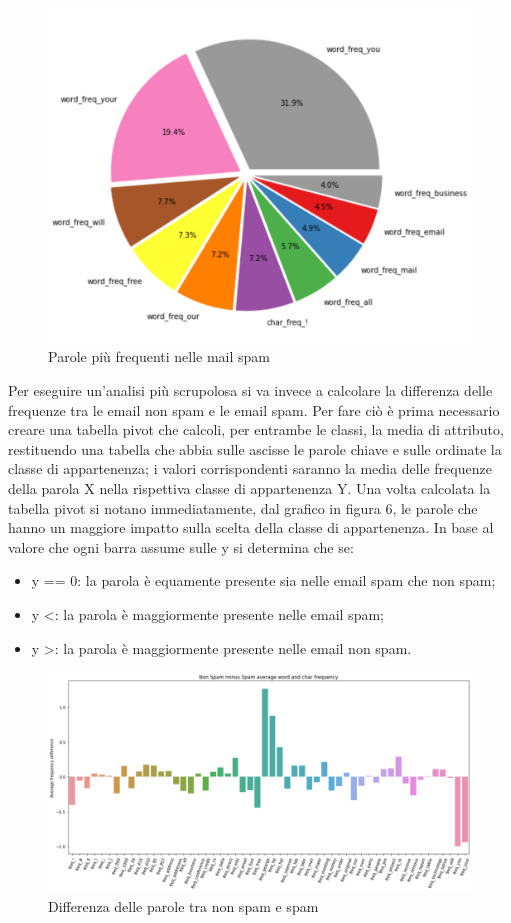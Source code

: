 \documentclass[12pt,a4paper]{article}
\begin{document}
\begin{figure}[H]
    \centering
    \includegraphics[width=.8\linewidth]{top_10_only_spam.png}
    \caption{Parole più frequenti nelle mail spam}
\end{figure}
Per eseguire un'analisi più scrupolosa si va invece a calcolare la differenza delle frequenze tra le email non spam e le email spam.
Per fare ciò è prima necessario creare una tabella pivot che calcoli, per entrambe le classi, la media di attributo, restituendo una tabella che abbia sulle ascisse le parole chiave e sulle ordinate la classe di appartenenza; i valori corrispondenti saranno la media delle frequenze della parola X nella rispettiva classe di appartenenza Y.
Una volta calcolata la tabella pivot si notano immediatamente, dal grafico in figura 6, le parole che hanno un maggiore impatto sulla scelta della classe di appartenenza. In base al valore che ogni barra assume sulle y si determina che se:
\begin{itemize}
    \item y == 0: la parola è equamente presente sia nelle email spam che non spam;
    \item y \textless  {}: la parola è maggiormente presente nelle email spam;
    \item y \textgreater {}: la parola è maggiormente presente nelle email non spam.
\end{itemize}

\begin{figure}[H]
    \includegraphics[width=1\columnwidth]{df_difference_barplot.png}
    \caption{Differenza delle parole tra non spam e spam }
\end{figure}
\end{document}

